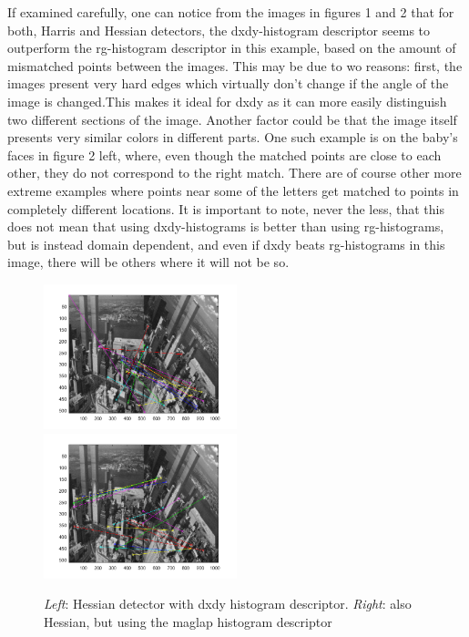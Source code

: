 \documentclass[12pt]{article}
\begin{document}
\begin{enumerate}[a)]
	If examined carefully, one can notice from the images in figures 1 and 2 that for both, Harris and Hessian detectors, the dxdy-histogram descriptor seems to outperform the rg-histogram descriptor in this example, based on the amount of mismatched points between the images. This may be due to wo reasons: first, the images present very hard edges which virtually don't change if the angle of the image is changed.This makes it ideal for dxdy as it can more easily distinguish two different sections of the image. Another factor could be that the image itself presents very similar colors in different parts. One such example is on the baby's faces in figure 2 left, where, even though the matched points are close to each other, they do not correspond to the right match. There are of course other more extreme examples where points near some of the letters get matched to points in completely different locations.
	It is important to note, never the less, that this does not mean that using dxdy-histograms is better than using rg-histograms, but is instead domain dependent, and even if dxdy beats rg-histograms in this image, there will be others where it will not be so.
	
	
	\begin{figure}[h]
		\includegraphics[width=0.5\textwidth]{ny_hes_dxdy}
		\includegraphics[width=0.5\textwidth]{ny_hes_maglap}
		\caption{\textit{Left}: Hessian detector with dxdy histogram descriptor. \textit{Right}: also Hessian, but using the maglap histogram descriptor }
	\end{figure}
	

\end{enumerate}
\end{document}
